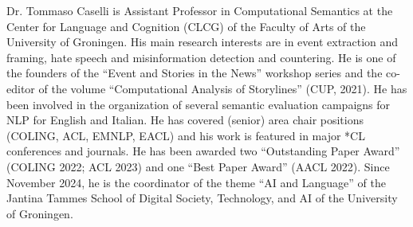 Dr. Tommaso Caselli is Assistant Professor in Computational Semantics at the Center for Language and Cognition (CLCG) of the Faculty of Arts of the University of Groningen. His main research interests are in event extraction and framing, hate speech and misinformation detection and countering. He is one of the founders of the “Event and Stories in the News” workshop series and the co-editor of the volume “Computational Analysis of Storylines” (CUP, 2021). He has been involved in the organization of several semantic evaluation campaigns for NLP for English and Italian. He has covered (senior) area chair positions (COLING, ACL, EMNLP, EACL) and his work is featured in major *CL conferences and journals. He has been awarded two “Outstanding Paper Award” (COLING 2022; ACL 2023) and one “Best Paper Award” (AACL 2022). Since November 2024, he is the coordinator of the theme “AI and Language” of the Jantina Tammes School of Digital Society, Technology, and AI of the University of Groningen.